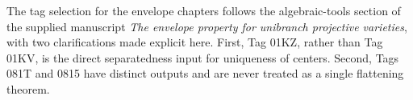 \begin{remark}
\label{rem:stacks-source-note}
The tag selection for the envelope chapters follows the algebraic-tools
section of the supplied manuscript
\emph{The envelope property for unibranch projective varieties}, with two
clarifications made explicit here. First, Tag 01KZ, rather than Tag 01KV,
is the direct separatedness input for uniqueness of centers. Second,
Tags 081T and 0815 have distinct outputs and are never treated as a single
flattening theorem.
\end{remark}
